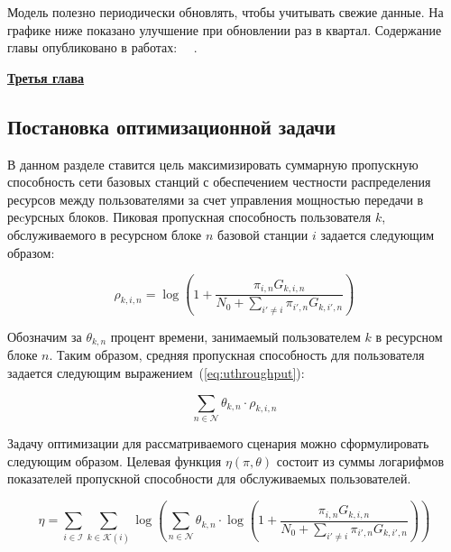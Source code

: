 Модель полезно периодически обновлять, чтобы учитывать свежие данные. На графике ниже показано улучшение при обновлении раз в квартал.
Содержание главы опубликовано в работах:~\cite{itivs-2017} ~\cite{bulletin-rzd}.


\underline{\textbf{Третья глава}}
\subsection{Постановка оптимизационной задачи}
В данном разделе ставится цель максимизировать суммарную пропускную способность сети базовых станций с обеспечением честности распределения ресурсов между пользователями за счет управления мощностью передачи в реcурсных блоков. Пиковая пропускная способность пользователя $k$, обслуживаемого в ресурсном блоке $n$ базовой станции $i$ задается следующим образом:

\begin{equation}
    \label{eq:throughput}
    \rho_{k,i,n} = \log \left(1 + \frac{\pi_{i,n} G_{k,i,n}}{N_0 + \sum_{i'\neq i}{\pi_{i',n} G_{k,i',n}}}\right)
\end{equation}

Обозначим за $\theta_{k,n}$ процент времени, занимаемый пользователем $k$ в ресурсном блоке $n$. Таким образом, средняя пропускная способность для пользователя задается следующим выражением~(\ref{eq:uthroughput}):

\begin{equation}
    \label{eq:uthroughput}
    \sum_{n \in \mathcal{N}} \theta_{k,n} \cdot \rho_{k,i,n}
\end{equation}

Задачу оптимизации для рассматриваемого сценария можно сформулировать следующим образом. Целевая функция $\eta(\pi, \theta)$ состоит из суммы логарифмов показателей пропускной способности для обслуживаемых пользователей.

\begin{equation}
\label{eq:maximize}
\eta = \sum_{i \in \mathcal{I}} \sum_{k \in \mathcal{K}(i)} \log \left(\sum_{n \in \mathcal{N}} \theta_{k,n} \cdot \log \left(1 + \frac{\pi_{i,n} G_{k,i,n}}{N_0 + \sum_{i'\neq i}{\pi_{i',n} G_{k,i',n}}}\right)\right)
\end{equation}

